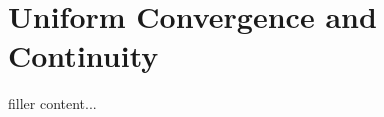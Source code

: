 \section{Uniform Convergence and Continuity}\label{sec:uniform-convergence-and-continuity}

filler content...

